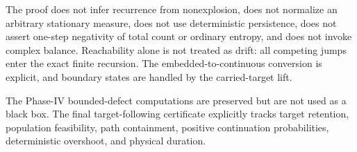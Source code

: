 \documentclass[11pt]{article}
\theoremstyle{definition}
\begin{document}
The proof does not infer recurrence from nonexplosion, does not normalize an
arbitrary stationary measure, does not use deterministic persistence, does
not assert one-step negativity of total count or ordinary entropy, and does
not invoke complex balance.  Reachability alone is not treated as drift: all
competing jumps enter the exact finite recursion.  The embedded-to-continuous
conversion is explicit, and boundary states are handled by the carried-target
lift.

The Phase-IV bounded-defect computations are preserved but are not used as a
black box.  The final target-following certificate explicitly tracks target
retention, population feasibility, path containment, positive continuation
probabilities, deterministic overshoot, and physical duration.
\end{document}
